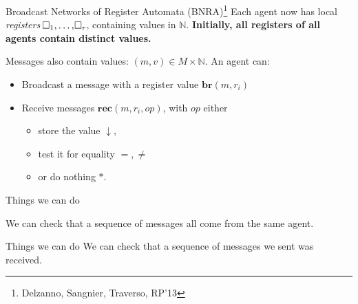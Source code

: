 \documentclass{beamer}
\newcommand{\reg}{\hspace{-0.5mm}\square}
\begin{document}
\begin{frame}{Broadcast Networks of Register Automata (BNRA)\footnote{Delzanno, Sangnier, Traverso, RP'13}}
	Each agent now has local \emph{registers} $\reg_1, \ldots, \reg_r$, containing values in $\mathbb{N}$.
	\pause
	\textbf{Initially, all registers of all agents contain distinct values.}
	
	\pause
	\vspace{0.2cm}
	Messages also contain values: $(m, v) \in M\times \mathbb{N}$.
	An agent can:
	\begin{itemize}
		\item Broadcast a message with a register value $\mathbf{br}(m, r_i)$\vspace{0.3cm}\pause
		
		
		\item Receive messages $\mathbf{rec}(m, r_i, op)$, with $op$ either
		\begin{itemize}
			\item store the value $\downarrow$,
			
			\item test it for equality $=, \neq$
			
			\item or do nothing $*$.
		\end{itemize}   
	\end{itemize}
\end{frame}

\begin{frame}{Things we can do}
	
	We can check that a sequence of messages all come from the same agent.

	\begin{center}
	
	\end{center}
\end{frame}

\begin{frame}{Things we can do}
	We can check that a sequence of messages we sent was received.
	
	\centering
		
\end{frame}
\end{document}
